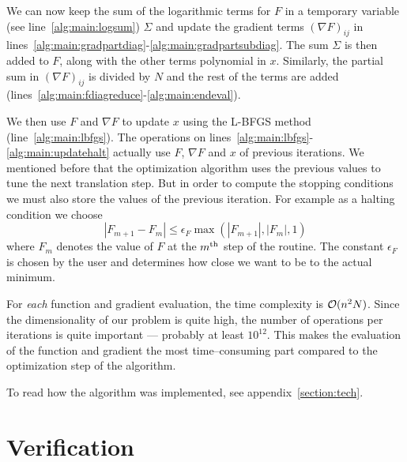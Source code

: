 \documentclass[a4paper,12pt,twoside]{article}
\def \be {\begin{equation}}
\def \ee {\end{equation}}
\def \grad{\nabla}
\def \order {{\cal O}}
\begin{document}
We can now keep the sum of the logarithmic terms for $F$ in a temporary variable (see line~\ref{alg:main:logsum}) $\Sigma$ and update the gradient terms $(\grad F)_{ij}$ in lines~\ref{alg:main:gradpartdiag}-\ref{alg:main:gradpartsubdiag}.
The sum $\Sigma$ is then added to $F$, along with the other  terms polynomial in $x$. Similarly, the partial sum in $(\grad F)_{ij}$ is divided by $N$ and the rest of the terms are added (lines~\ref{alg:main:fdiagreduce}-\ref{alg:main:endeval}).

We then use $F$ and $\grad F$ to update $x$ using the L-BFGS method (line~\ref{alg:main:lbfgs}). 
The operations on lines~\ref{alg:main:lbfgs}-\ref{alg:main:updatehalt} actually use $F$, $\grad F$ and $x$ of previous iterations.
We mentioned before that the optimization algorithm uses the previous values to tune the next translation step.
But in order to compute the stopping conditions we must also store the values of the previous iteration.
For example as a halting condition we choose
\be
  | F_{m+1} - F_m | \leq \epsilon_F\max(|F_{m+1}|,|F_m|,1)
  \label{eq:halting}
\ee
where $F_m$ denotes the value of $F$ at the $m^{\rm th}$ step of the routine.
The constant $\epsilon_F$ is chosen by the user and  determines how close we want to be to the actual minimum.

For {\em each} function and gradient evaluation, the time complexity is $\order(n^2 N)$. Since the dimensionality of our problem is quite high, the number of operations per iterations is quite important --- probably at least $10^{12}$. This makes the evaluation of the function and gradient the most time--consuming part compared to the optimization step of the algorithm.

To read how the algorithm was implemented, see appendix~\ref{section:tech}.

\section{Verification}
\end{document}
